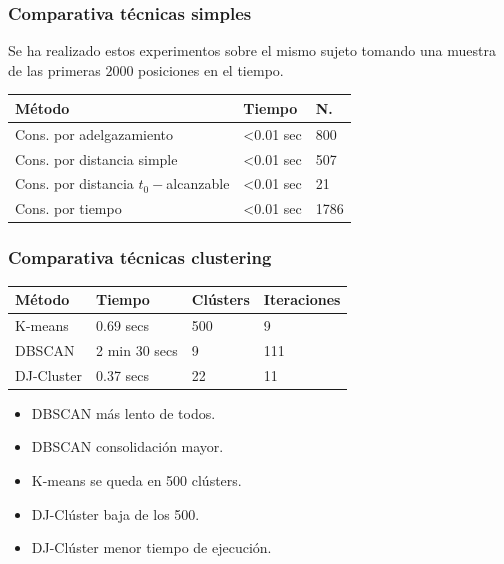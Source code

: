 \documentclass[10pt, spanish]{beamer}
\begin{document}
\begin{frame}[fragile]
\frametitle{Comparativa t\'ecnicas simples}

Se ha realizado estos experimentos sobre el mismo sujeto tomando una muestra de las primeras $2000$ posiciones en el tiempo.\\

\begin{center}
\begin{tabular}{|l|l|l|}
	\hline
	\rowcolor{Gray}
	M\'etodo & Tiempo & N. \\
	\hline	
	Cons. por adelgazamiento &  <0.01 sec & 800 \\
	\hline 
	Cons. por distancia simple &  <0.01 sec & 507 \\
	\hline
	Cons. por distancia $t_0-$alcanzable  &  <0.01 sec  & 21\\
	\hline
	Cons. por tiempo &  <0.01 sec  & 1786\\
	\hline
\end{tabular}
\end{center}

\end{frame}

\begin{frame}[fragile]
\frametitle{Comparativa t\'ecnicas clustering}
\begin{center}
\begin{tabular}{|l|l|l|l|}
	\hline
	\rowcolor{Gray}
	M\'etodo & Tiempo & Cl\'usters & Iteraciones\\
	\hline	
	K-means & 0.69 secs & 500 & 9\\
	\hline
	DBSCAN &  2 min 30 secs & 9 & 111 \\
	\hline
	DJ-Cluster &  0.37 secs & 22  & 11\\
	\hline
\end{tabular}
\end{center}

\begin{itemize}
	\item DBSCAN m\'as lento de todos.
	\item DBSCAN consolidaci\'on mayor.
	\item K-means se queda en 500 cl\'usters.
	\item DJ-Cl\'uster baja de los 500.
	\item DJ-Cl\'uster menor tiempo de ejecuci\'on.
\end{itemize}

\end{frame}
\end{document}

